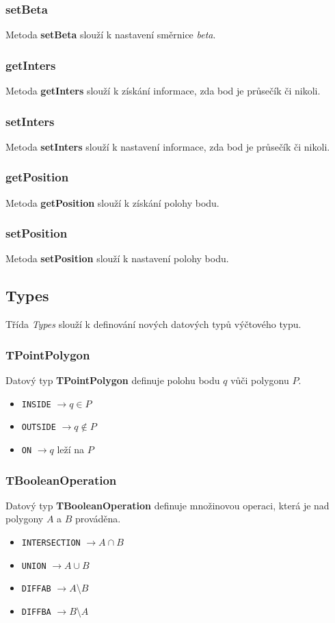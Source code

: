 \documentclass[a4paper, 12pt]{article}
\begin{document}
\subsubsection*{setBeta}
Metoda \textbf{setBeta} slouží k nastavení směrnice \textsl{beta}. 

\subsubsection*{getInters}
Metoda \textbf{getInters} slouží k získání informace, zda bod je průsečík či nikoli.

\subsubsection*{setInters}
Metoda \textbf{setInters} slouží k nastavení informace, zda bod je průsečík či nikoli. 

\subsubsection*{getPosition}
Metoda \textbf{getPosition} slouží k získání polohy bodu.

\subsubsection*{setPosition}
Metoda \textbf{setPosition} slouží k nastavení polohy bodu. 


\subsection{Types}
Třída \textit{Types} slouží k definování nových datových typů výčtového typu.

\subsubsection*{TPointPolygon}
Datový typ \textbf{TPointPolygon} definuje polohu bodu $q$ vůči polygonu $P$.\\ 
\begin{itemize}
\item \texttt{INSIDE} $\rightarrow q \in P$
\item \texttt{OUTSIDE} $\rightarrow q \notin P$
\item \texttt{ON} $\rightarrow q$ leží na $P$
\end{itemize}

\subsubsection*{TBooleanOperation}
Datový typ \textbf{TBooleanOperation} definuje množinovou operaci, která je nad polygony $A$ a $B$ prováděna.\\ 
\begin{itemize}
\item \texttt{INTERSECTION} $\rightarrow A \cap B$ 
\item \texttt{UNION} $\rightarrow A \cup B$
\item \texttt{DIFFAB} $\rightarrow A$\textbackslash $B$
\item \texttt{DIFFBA} $\rightarrow B$\textbackslash $A$
\end{itemize}
\end{document}
